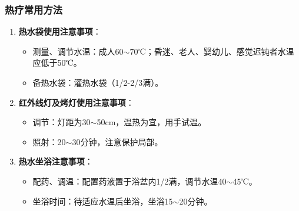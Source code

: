 \documentclass[11pt, a4paper]{ctexart}
\begin{document}
\subsubsection{热疗常用方法}
\begin{enumerate}
	\item \textbf{热水袋使用注意事项}：
	      \begin{itemize}
		      \item 测量、调节水温：成人60$\sim$70℃；昏迷、老人、婴幼儿、感觉迟钝者水温应低于50℃。
		      \item 备热水袋：灌热水袋（1/2-2/3满）。
	      \end{itemize}
	\item \textbf{红外线灯及烤灯使用注意事项}：
	      \begin{itemize}
		      \item 调节：灯距为30$\sim$50cm，温热为宜，用手试温。
		      \item 照射：20$\sim$30分钟，注意保护局部。
	      \end{itemize}
	\item \textbf{热水坐浴注意事项}：
	      \begin{itemize}
		      \item 配药、调温：配置药液置于浴盆内1/2满，调节水温40$\sim$45℃。
		      \item 坐浴时间：待适应水温后坐浴，坐浴15$\sim$20分钟。
	      \end{itemize}
\end{enumerate}
\end{document}
